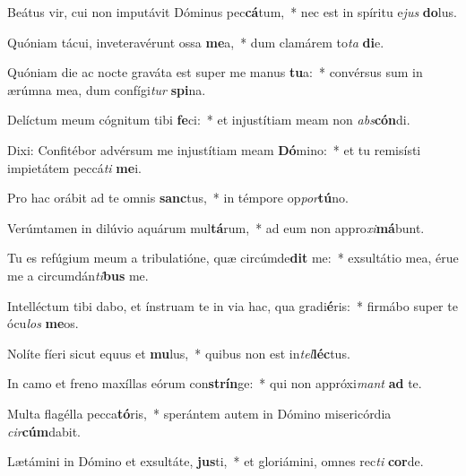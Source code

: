 \item Beátus vir, cui non imputávit Dóminus pec\textbf{cá}tum,~* nec est in spíritu e\textit{jus} \textbf{do}lus.
\item Quóniam tácui, inveteravérunt ossa \textbf{me}a,~* dum clamárem to\textit{ta} \textbf{di}e.
\item Quóniam die ac nocte graváta est super me manus \textbf{tu}a:~* convérsus sum in ærúmna mea, dum confígi\textit{tur} \textbf{spi}na.
\item Delíctum meum cógnitum tibi \textbf{fe}ci:~* et injustítiam meam non \textit{abs}\textbf{cón}di.
\item Dixi: Confitébor advérsum me injustítiam meam \textbf{Dó}mino:~* et tu remisísti impietátem peccá\textit{ti} \textbf{me}i.
\item Pro hac orábit ad te omnis \textbf{sanc}tus,~* in témpore op\textit{por}\textbf{tú}no.
\item Verúmtamen in dilúvio aquárum mul\textbf{tá}rum,~* ad eum non appro\textit{xi}\textbf{má}bunt.
\item Tu es refúgium meum a tribulatióne, quæ circúmde\textbf{dit} me:~* exsultátio mea, érue me a circumdán\textit{ti}\textbf{bus} me.
\item Intelléctum tibi dabo, et ínstruam te in via hac, qua gradi\textbf{é}ris:~* firmábo super te ócu\textit{los} \textbf{me}os.
\item Nolíte fíeri sicut equus et \textbf{mu}lus,~* quibus non est in\textit{tel}\textbf{léc}tus.
\item In camo et freno maxíllas eórum con\textbf{strín}ge:~* qui non appróxi\textit{mant} \textbf{ad} te.
\item Multa flagélla pecca\textbf{tó}ris,~* sperántem autem in Dómino misericórdia \textit{cir}\textbf{cúm}dabit.
\item Lætámini in Dómino et exsultáte, \textbf{jus}ti,~* et gloriámini, omnes rec\textit{ti} \textbf{cor}de.
